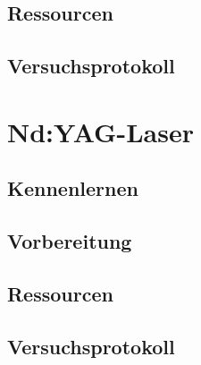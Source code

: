 \documentclass[
    twoside=true, 
    footinclude=off, 
    captions=tableheading, 
    DIV=12;usenames,
    dvipsnames
]{scrbook}
\begin{document}
    \newpage
    \section{Ressourcen}
        

    \newpage
    \section{Versuchsprotokoll}
        

\chapter{Nd:YAG-Laser}
    \section{Kennenlernen}
        

    \newpage
    \section{Vorbereitung}
        

    \newpage
    \section{Ressourcen}
        

    \newpage
    \section{Versuchsprotokoll}
        


    




%
\end{document}

